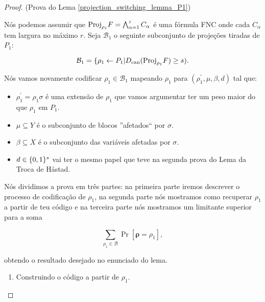 \begin{proof} (Prova do Lema \ref{projection_switching_lemma_P1})

Nós podemos assumir que $\text{Proj}_{\rho_{1}}F = \bigwedge_{\alpha = 1}^{z} C_{\alpha}$ é uma fórmula FNC onde cada $C_{\alpha}$ tem largura no máximo $r$. Seja $\mathcal{B}_{1}$ o seguinte subconjunto de projeções tiradas de $P_{1}$:

\begin{equation*}
	\mathcal{B}_{1} = \{ \rho_{1} \leftarrow P_{1} \lvert D_{\text{can}}(\text{Proj}_{\rho_{1}}F) \geq s).
\end{equation*}

Nós vamos novamente codificar $\rho_{1} \in \mathcal{B}_{1}$ mapeando $\rho_{1}$ para $(\rho_{1}^{\prime}, \mu, \beta, d)$ tal que:

\begin{itemize}

	\item $\rho_{1}^{\prime} = \rho_{1}\sigma$ é uma extensão de $\rho_{1}$ que vamos argumentar ter um peso maior do que $\rho_{1}$ em $P_{1}$.
	
	\item $\mu \subseteq Y$ é o subconjunto de blocos ''afetados`` por $\sigma$.
	
	\item $\beta \subseteq X$ é o subconjunto das variáveis afetadas por $\sigma$.
	
	\item $d \in \{0, 1\}^{s}$ vai ter o mesmo papel que teve na segunda prova do Lema da Troca de Håstad.
	
\end{itemize}

Nós dividimos a prova em três partes: na primeira parte iremos descrever o processo de codificação de $\rho_{1}$, na segunda parte nós mostramos como recuperar $\rho_{1}$ a partir de teu código e na terceira parte nós mostramos um limitante superior para a soma

\begin{equation} \label{projection_switching_lemma_proof_sum}
	\sum_{\rho_{1} \in \mathcal{B}} \Pr[\boldsymbol{\rho} = \rho_{1}],
\end{equation}

obtendo o resultado desejado no enunciado do lema.

\begin{enumerate}

	\item Construindo o código a partir de $\rho_{1}$.
	

\end{enumerate}
\end{proof}
